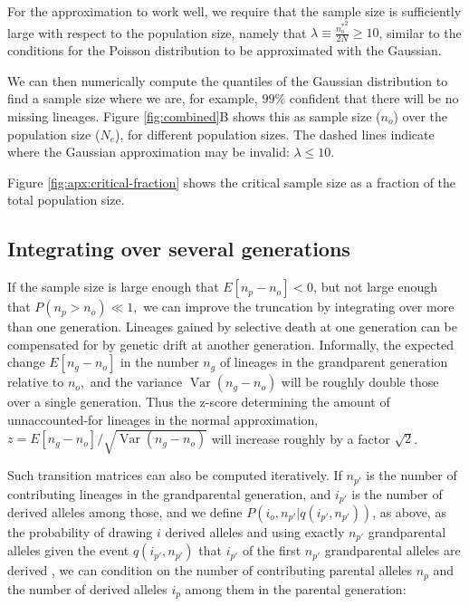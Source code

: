 \documentclass[review]{elsarticle}
\newcommand{\sgcomment}[1]{{\color{red}{SG: #1}}}
\begin{document}
For the approximation to work well, we require that the sample size is sufficiently large with
respect to the population size, namely that $\lambda \equiv \frac{{n_o^*}^2}{2N} \ge 10$, similar to
the conditions for the Poisson distribution to be approximated with the Gaussian.

We can then numerically compute the quantiles of the Gaussian distribution to find a sample size
where we are, for example, $99\%$ confident that there will be no missing lineages. Figure
\ref{fig:combined}B shows this as sample size ($n_o$) over the population size ($N_e$), for
different population sizes. The dashed lines indicate where the Gaussian approximation may be
invalid: $\lambda \le 10$.

Figure \ref{fig:apx:critical-fraction} shows the critical sample size as a fraction of the total
population size.

\subsection
{Integrating over several generations} 

If the sample size is large enough that $E[n_p-n_o]<0$, but not large enough that
$P(n_p>n_o) \ll 1,$ we can improve the truncation by integrating over more than one generation.
Lineages gained by selective death at one generation can be compensated for by genetic drift at
another generation. Informally, the expected change $E[n_g-n_o]$ in the number $n_g$ of lineages in
the grandparent generation relative to $n_o,$ and the variance $\operatorname{Var}(n_g-n_o)$ will be
roughly double those over a single generation. Thus the z-score determining the amount of
unnaccounted-for lineages in the normal approximation,
$z= E[n_g-n_o] / \sqrt{\operatorname{Var}(n_g-n_o)}$ will increase roughly by a factor $\sqrt{2}$.

Such transition matrices can also be computed iteratively. If $n_{p'}$ is the number of contributing
lineages in the grandparental generation, and $i_{p'}$ is the number of derived alleles among those,
and we define $P(i_o, n_{p'} | q(i_{p'}, n_{p'}))$, as above, as the probability of drawing $i$
derived alleles and using exactly $n_{p'}$ grandparental alleles given the event $q(i_{p'}, n_{p'})$
that $i_{p'}$ of the first $n_{p'}$ grandparental alleles are derived \sgcomment{We would need to
  reconcile the notation here with the previous one}, we can condition on the number of contributing
parental alleles $n_p$ and the number of derived alleles $i_p$ among them in the parental
generation: \sgcomment{define $S'$}
 
\end{document}
